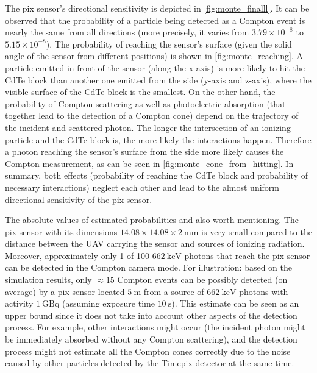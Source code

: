 The \ac{pix} sensor's directional sensitivity is depicted in \autoref{fig:monte_finalll}.
It can be observed that the probability of a particle being detected as a Compton event is nearly the same from all directions (more precisely, it varies from $3.79 \times 10^{-8}$ to $5.15\times 10^{-8}$).
The probability of reaching the sensor's surface (given the solid angle of the sensor from different positions) is shown in \autoref{fig:monte_reaching}.
A particle emitted in front of the sensor (along the x-axis) is more likely to hit the \ac{CdTe} block than another one emitted from the side (y-axis and z-axis), where the visible surface of the \ac{CdTe} block is the smallest.
On the other hand, the probability of Compton scattering as well as photoelectric absorption (that together lead to the detection of a Compton cone) depend on the trajectory of the incident and scattered photon.
The longer the intersection of an ionizing particle and the \ac{CdTe} block is, the more likely the interactions happen.
Therefore a photon reaching the sensor's surface from the side more likely causes the Compton measurement, as can be seen in \autoref{fig:monte_cone_from_hitting}.
In summary, both effects (probability of reaching the \ac{CdTe} block and probability of necessary interactions) neglect each other and lead to the almost uniform directional sensitivity of the \ac{pix} sensor.

The absolute values of estimated probabilities and also worth mentioning.
The \ac{pix} sensor with its dimensions $14.08 \times 14.08 \times 2 \ \si{\milli\meter}$ is very small compared to the distance between the \ac{UAV} carrying the sensor and sources of ionizing radiation.
Moreover, approximately only 1 of 100 $\SI{662}{\kilo\electronvolt}$ photons that reach the \ac{pix} sensor can be detected in the Compton camera mode.
For illustration: based on the simulation results, only $\approx 15$ Compton events can be possibly detected (on average) by a \ac{pix} sensor located $\SI{5}{\meter}$ 
from a source of $\SI{662}{\kilo\electronvolt}$ photons  with activity $\SI{1}{\giga\becquerel}$
(assuming exposure time $\SI{10}{\second}$). 
This estimate can be seen as an upper bound since it does not take into account other aspects of the detection process.
For example, other interactions might occur (the incident photon might be immediately absorbed without any Compton scattering), and the detection process might not estimate all the Compton cones correctly due to the noise caused by other particles detected by the Timepix detector at the same time.

